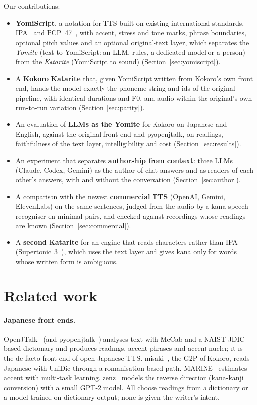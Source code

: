 \documentclass[11pt,a4paper]{article}
\begin{document}
Our contributions:
\begin{itemize}
  \item \textbf{YomiScript}, a notation for TTS built on existing international standards, IPA~\citep{ipa1999handbook}
  and BCP~47~\citep{rfc5646}, with accent, stress and tone
  marks, phrase boundaries, optional pitch values and an optional original-text layer, which separates the
  \emph{Yomite} (text to YomiScript: an LLM, rules, a dedicated model or a person) from the \emph{Katarite}
  (YomiScript to sound) (Section~\ref{sec:yomiscript}).
  \item A \textbf{Kokoro Katarite} that, given YomiScript written from Kokoro's own front end, hands the model exactly
  the phoneme string and ids of the original pipeline, with identical durations and F0, and audio within the
  original's own run-to-run variation (Section~\ref{sec:parity}).
  \item An evaluation of \textbf{LLMs as the Yomite} for Kokoro on Japanese and English, against the original front
  end and pyopenjtalk, on readings, faithfulness of the text layer, intelligibility and cost (Section~\ref{sec:results}).
  \item An experiment that separates \textbf{authorship from context}: three LLMs (Claude, Codex, Gemini) as the author
  of chat answers and as readers of each other's answers, with and without the conversation (Section~\ref{sec:author}).
  \item A comparison with the newest \textbf{commercial TTS} (OpenAI, Gemini, ElevenLabs) on the same sentences, judged
  from the audio by a kana speech recogniser on minimal pairs, and checked against recordings whose readings are known
  (Section~\ref{sec:commercial}).
  \item A \textbf{second Katarite} for an engine that reads characters rather than IPA (Supertonic~3~\citep{supertonic3}),
  which uses the text layer and gives kana only for words whose written form is ambiguous.
\end{itemize}

\section{Related work}

\paragraph{Japanese front ends.} OpenJTalk~\citep{openjtalk} (and pyopenjtalk~\citep{pyopenjtalk}) analyses text with
MeCab and a NAIST-JDIC-based dictionary and produces readings, accent phrases and accent nuclei; it is the de facto
front end of open Japanese TTS. misaki~\citep{misaki}, the G2P of Kokoro, reads Japanese with UniDic through a
romanisation-based path. MARINE~\citep{park2022marine} estimates accent with multi-task learning. zenz~\citep{zenz}
models the reverse direction (kana-kanji conversion) with a small GPT-2 model. All choose readings from a dictionary
or a model trained on dictionary output; none is given the writer's intent.
\end{document}
